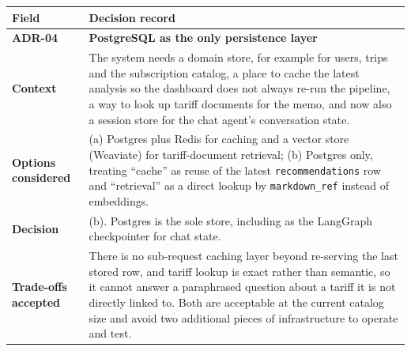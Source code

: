 \documentclass[
  11pt,
  a4paper,
  DIV=11,
  numbers=noendperiod,
  notitlepage]{scrreprt}
\newcounter{none} %
\begin{document}
{\def\LTcaptype{none} %
\begin{longtable}[]{@{}
  >{\raggedright\arraybackslash}p{}
  >{\raggedright\arraybackslash}p{}@{}}
\toprule\noalign{}
\begin{minipage}[b]{\linewidth}\raggedright
Field
\end{minipage} & \begin{minipage}[b]{\linewidth}\raggedright
Decision record
\end{minipage} \\
\midrule\noalign{}
\endhead
\bottomrule\noalign{}
\endlastfoot
\textbf{ADR-04} & \textbf{PostgreSQL as the only persistence layer} \\
\textbf{Context} & The system needs a domain store, for example for
users, trips and the subscription catalog, a place to cache the latest
analysis so the dashboard does not always re-run the pipeline, a way to
look up tariff documents for the memo, and now also a session store for
the chat agent's conversation state. \\
\textbf{Options considered} & (a) Postgres plus Redis for caching and a
vector store (Weaviate) for tariff-document retrieval; (b) Postgres
only, treating ``cache'' as reuse of the latest \texttt{recommendations}
row and ``retrieval'' as a direct lookup by \texttt{markdown\_ref}
instead of embeddings. \\
\textbf{Decision} & (b). Postgres is the sole store, including as the
LangGraph checkpointer for chat state. \\
\textbf{Trade-offs accepted} & There is no sub-request caching layer
beyond re-serving the last stored row, and tariff lookup is exact rather
than semantic, so it cannot answer a paraphrased question about a tariff
it is not directly linked to. Both are acceptable at the current catalog
size and avoid two additional pieces of infrastructure to operate and
test. \\
\end{longtable}
}
\end{document}
